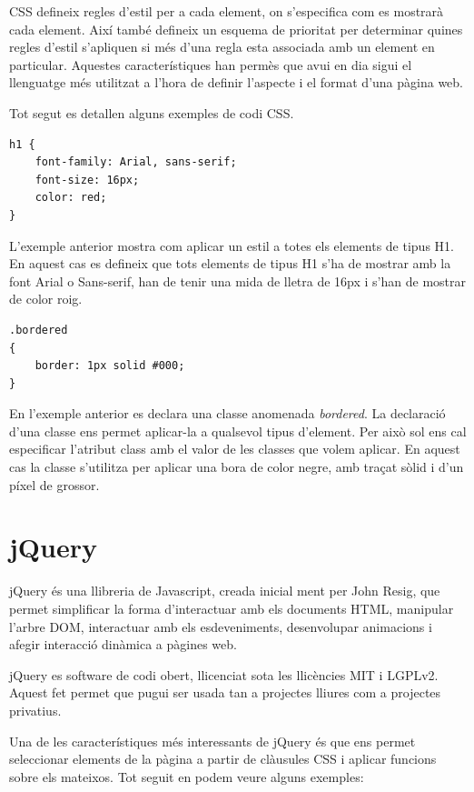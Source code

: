 CSS defineix regles d'estil per a cada element, on s'especifica com es mostrarà cada element. Així també defineix un esquema de prioritat per determinar quines regles d'estil s'apliquen si més d'una regla esta associada amb un element en particular. Aquestes característiques han permès que avui en dia sigui el llenguatge més utilitzat a l'hora de definir l'aspecte i el format d'una pàgina web. 

Tot segut es detallen alguns exemples de codi CSS. 

\begin{lstlisting}
h1 {
    font-family: Arial, sans-serif; 
    font-size: 16px;
    color: red;
}
\end{lstlisting}

L'exemple anterior mostra com aplicar un estil a totes els elements de tipus H1. En aquest cas es defineix que tots elements de tipus H1 s'ha de mostrar amb la font Arial o Sans-serif, han de tenir una mida de lletra de 16px i s'han de mostrar de color roig.  

\begin{lstlisting}
.bordered
{
    border: 1px solid #000;
}
\end{lstlisting}

En l'exemple anterior es declara una classe anomenada \emph{bordered}. La declaració d'una classe ens permet aplicar-la a qualsevol tipus d'element. Per això sol ens cal especificar l'atribut class amb el valor de les classes que volem aplicar. En aquest cas la classe s'utilitza per aplicar una bora de color negre, amb traçat sòlid i d'un píxel de grossor. 

\section{jQuery}

jQuery és una llibreria de Javascript, creada inicial ment per John Resig, que permet simplificar la forma d'interactuar amb els documents HTML, manipular l'arbre DOM, interactuar amb els esdeveniments, desenvolupar animacions i afegir interacció dinàmica a pàgines web. 

jQuery es software de codi obert, llicenciat sota les llicències MIT i LGPLv2. Aquest fet permet que pugui ser usada tan a projectes lliures com a projectes privatius. 

Una de les característiques més interessants de jQuery és que ens permet seleccionar elements de la pàgina a partir de clàusules CSS i aplicar funcions sobre els mateixos. Tot seguit en podem veure alguns exemples: 

